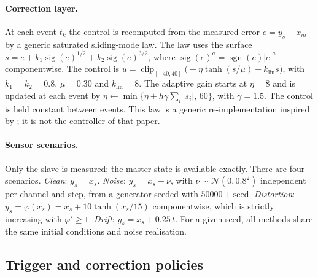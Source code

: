 \documentclass[10pt,a4paper]{article}
\newcommand{\sgn}{\operatorname{sgn}}
\begin{document}
\paragraph{Correction layer.} At each event $t_k$ the control is recomputed from the measured error $e=y_s-x_m$ by a generic saturated sliding-mode law. The law uses the surface $s=e+k_1\operatorname{sig}(e)^{1/2}+k_2\operatorname{sig}(e)^{3/2}$, where $\operatorname{sig}(e)^a=\sgn(e)|e|^a$ componentwise. The control is $u=\operatorname{clip}_{[-40,40]}\big(-\eta\tanh(s/\mu)-k_{\mathrm{lin}}s\big)$, with $k_1=k_2=0.8$, $\mu=0.30$ and $k_{\mathrm{lin}}=8$. The adaptive gain starts at $\eta=8$ and is updated at each event by $\eta\leftarrow\min\{\eta+h\gamma\sum_i|s_i|,\,60\}$, with $\gamma=1.5$. The control is held constant between events. This law is a generic re-implementation inspired by \citep{taghavifar2026}; it is not the controller of that paper.

\paragraph{Sensor scenarios.} Only the slave is measured; the master state is available exactly. There are four scenarios. \emph{Clean}: $y_s=x_s$. \emph{Noise}: $y_s=x_s+\nu$, with $\nu\sim\mathcal N(0,0.8^2)$ independent per channel and step, from a generator seeded with $50000+\text{seed}$. \emph{Distortion}: $y_s=\varphi(x_s)=x_s+10\tanh(x_s/15)$ componentwise, which is strictly increasing with $\varphi'\ge1$. \emph{Drift}: $y_s=x_s+0.25\,t$. For a given seed, all methods share the same initial conditions and noise realisation.

\subsection{Trigger and correction policies}\label{sec:policies}
\end{document}

